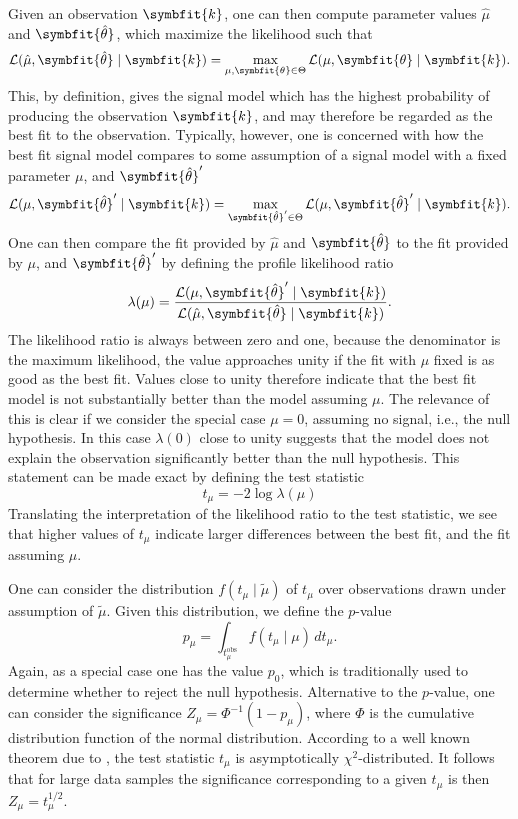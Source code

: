 \documentclass[b5paper, 10pt, twoside]{book}
\renewcommand{\vec}[1]{\symbfit{#1}}
\newcommand{\unitv}[1]{\symbfit{\hat{#1}}}
\newcommand{\difd}{\,d}
\begin{document}
Given an observation $\vec{k}$, one can then compute parameter values $\hat{\mu}$ and $\unitv{\theta}$, which maximize the likelihood such that
\begin{equation}
\mathcal{L}(\hat{\mu},\unitv{\theta}\mid\vec{k})=\max_{\mu,\vec{\theta}\in\Theta}\mathcal{L}(\mu,\vec{\theta}\mid\vec{k}).
\end{equation}
This, by definition, gives the signal model which has the highest probability of producing the observation $\vec{k}$, and may therefore be regarded as the best fit to the observation. Typically, however, one is concerned with how the best fit signal model compares to some assumption of a signal model with a fixed parameter $\mu$, and $\unitv{\theta}'$
\begin{equation}
\mathcal{L}(\mu,\unitv{\theta}'\mid\vec{k})=\max_{\unitv{\theta}'\in\Theta}\mathcal{L}(\mu,\unitv{\theta}'\mid\vec{k}).
\end{equation}
One can then compare the fit provided by $\hat{\mu}$ and $\unitv{\theta}$ to the fit provided by $\mu$, and $\unitv{\theta}'$ by defining the profile likelihood ratio
\begin{equation}
\lambda(\mu)=\frac{\mathcal{L}(\mu,\unitv{\theta}'\mid\vec{k})}{\mathcal{L}(\hat{\mu},\unitv{\theta}\mid\vec{k})}.
\end{equation}
The likelihood ratio is always between zero and one, because the denominator is the maximum likelihood, the value approaches unity if the fit with $\mu$ fixed is as good as the best fit. Values close to unity therefore indicate that the best fit model is not substantially better than the model assuming $\mu$. The relevance of this is clear if we consider the special case $\mu=0$, assuming no signal, i.e., the null hypothesis. In this case $\lambda(0)$ close to unity suggests that the model does not explain the observation significantly better than the null hypothesis. This statement can be made exact by defining the test statistic
\begin{equation}
t_\mu=-2\log\lambda(\mu)
\end{equation}
Translating the interpretation of the likelihood ratio to the test statistic, we see that higher values of $t_\mu$ indicate larger differences between the best fit, and the fit assuming $\mu$.

One can consider the distribution $f(t_\mu\mid\tilde{\mu})$ of $t_\mu$ over observations drawn under assumption of $\tilde{\mu}$. Given this distribution, we define the $p$-value
\begin{equation}
p_\mu=\int_{t_\mu^\text{obs}}f(t_\mu\mid\mu)\difd t_\mu.
\end{equation}
Again, as a special case one has the value $p_0$, which is traditionally used to determine whether to reject the null hypothesis. Alternative to the $p$-value, one can consider the significance $Z_\mu=\Phi^{-1}(1-p_\mu)$, where $\Phi$ is the cumulative distribution function of the normal distribution. According to a well known theorem due to \textcite{Wilks1938}, the test statistic $t_\mu$ is asymptotically $\chi^2$-distributed. It follows that for large data samples the significance corresponding to a given $t_\mu$ is then $Z_\mu=t_\mu^{1/2}$.
\end{document}
